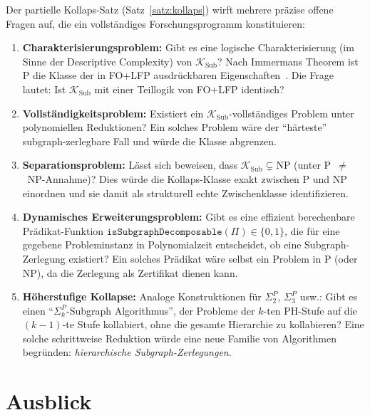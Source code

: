 ﻿\documentclass[a4paper,12pt]{article}
\theoremstyle{definition}
\begin{document}
Der partielle Kollaps-Satz (Satz~\ref{satz:kollaps}) wirft mehrere präzise
offene Fragen auf, die ein vollständiges Forschungsprogramm konstituieren:

\begin{enumerate}
  \item \textbf{Charakterisierungsproblem:}
        Gibt es eine logische Charakterisierung (im Sinne der Descriptive Complexity)
        von $\mathcal{K}_\mathrm{Sub}$?
        Nach Immermans Theorem ist P die Klasse der in FO+LFP ausdrückbaren Eigenschaften~\cite{immerman1999descriptive}.
        Die Frage lautet: Ist $\mathcal{K}_\mathrm{Sub}$ mit einer Teillogik von FO+LFP identisch?

  \item \textbf{Vollständigkeitsproblem:}
        Existiert ein $\mathcal{K}_\mathrm{Sub}$-vollständiges Problem unter
        polynomiellen Reduktionen? Ein solches Problem wäre der ``härteste''
        subgraph-zerlegbare Fall und würde die Klasse abgrenzen.

  \item \textbf{Separationsproblem:}
        Lässt sich beweisen, dass $\mathcal{K}_\mathrm{Sub} \subsetneq \mathrm{NP}$
        (unter P~$\neq$~NP-Annahme)? Dies würde die Kollaps-Klasse exakt
        zwischen P und NP einordnen und sie damit als strukturell echte
        Zwischenklasse identifizieren.

  \item \textbf{Dynamisches Erweiterungsproblem:}
        Gibt es eine effizient berechenbare Prädikat-Funktion
        $\mathtt{isSubgraphDecomposable}(\Pi) \in \{0,1\}$,
        die für eine gegebene Probleminstanz in Polynomialzeit entscheidet,
        ob eine Subgraph-Zerlegung existiert? Ein solches Prädikat wäre
        selbst ein Problem in P (oder NP), da die Zerlegung als Zertifikat dienen kann.

  \item \textbf{Höherstufige Kollapse:}
        Analoge Konstruktionen für $\Sigma_2^P$, $\Sigma_3^P$ usw.:
        Gibt es einen ``$\Sigma_k^P$-Subgraph Algorithmus'', der Probleme
        der $k$-ten PH-Stufe auf die $(k-1)$-te Stufe kollabiert,
        ohne die gesamte Hierarchie zu kollabieren?
        Eine solche schrittweise Reduktion würde eine neue Familie von
        Algorithmen begründen: \emph{hierarchische Subgraph-Zerlegungen}.
\end{enumerate}

\section{Ausblick}
\label{sec:ausblick}
\end{document}
